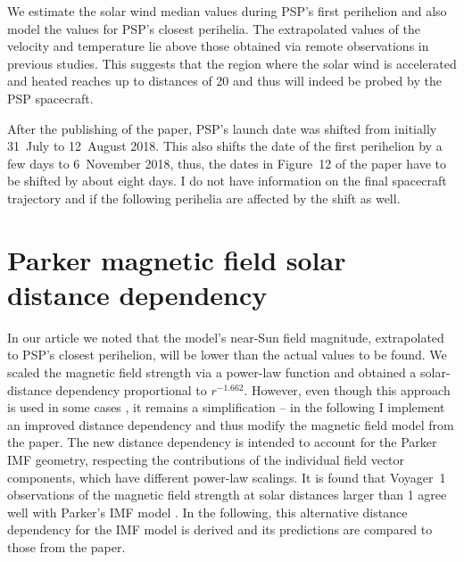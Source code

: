 We estimate the solar wind median values during PSP’s first perihelion and also model the values for PSP’s closest perihelia. The extrapolated values of the velocity and temperature lie above those obtained via remote observations in previous studies. This suggests that the region where the solar wind is accelerated and heated reaches up to distances of \SI{20}{\Rs} and thus will indeed be probed by the PSP spacecraft.

After the publishing of the paper, PSP's launch date was shifted from initially 31~July to 12~August 2018. This also shifts the date of the first perihelion by a few days to 6~November 2018, thus, the dates in Figure~12 of the paper have to be shifted by about eight days. I do not have information on the final spacecraft trajectory and if the following perihelia are affected by the shift as well.


\section{Parker magnetic field solar distance dependency}
\label{sec:Parker_IMF_solar_distance_dependency}
In our article we noted that the model's near-Sun field magnitude, extrapolated to PSP's closest perihelion, will be lower than the actual values to be found. We scaled the magnetic field strength via a power-law function and obtained a solar-distance dependency proportional to $r^{-1.662}$. However, even though this approach is used in some cases \citep[e.g.,][]{Coleman1969,Hellinger2013}, it remains a simplification -- in the following I implement an improved distance dependency and thus modify the magnetic field model from the paper. The new distance dependency is intended to account for the Parker IMF geometry, respecting the contributions of the individual field vector components, which have different power-law scalings. It is found that Voyager~1 observations of the magnetic field strength at solar distances larger than \SI{1}{\au} agree well with Parker’s IMF model \citep{Burlaga1984,Burlaga2002}. In the following, this alternative distance dependency for the IMF model is derived and its predictions are compared to those from the paper.

